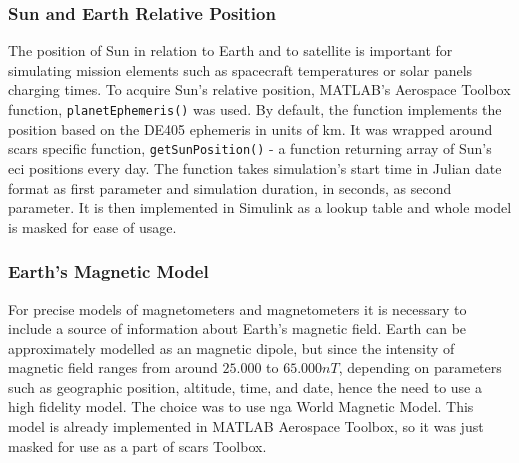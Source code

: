     \subsubsection{Sun and Earth Relative Position}
        The position of Sun in relation to Earth and to satellite is important for simulating mission elements such as spacecraft temperatures or solar panels charging times. To acquire Sun's relative position, MATLAB's Aerospace Toolbox function, \verb|planetEphemeris()| was used. By default, the function implements the position based on the DE405 ephemeris in units of km. It was wrapped around \ac{scars} specific function, \verb|getSunPosition()| - a function returning array of Sun's \ac{eci} positions every day. The function takes simulation's start time in Julian date format as first parameter and simulation duration, in seconds, as second parameter. It is then implemented in Simulink as a lookup table and whole model is masked for ease of usage.

    \subsubsection{Earth's Magnetic Model}
        For precise models of magnetometers and magnetometers it is necessary to include a source of information about Earth's magnetic field. Earth can be approximately modelled as an magnetic dipole, but since the intensity of magnetic field ranges from around $25.000$ to $65.000 nT$, depending on parameters such as geographic position, altitude, time, and date, hence the need to use a high fidelity model. The choice was to use \ac{nga} World Magnetic Model. This model is already implemented in MATLAB Aerospace Toolbox, so it was just masked for use as a part of \ac{scars} Toolbox.
 